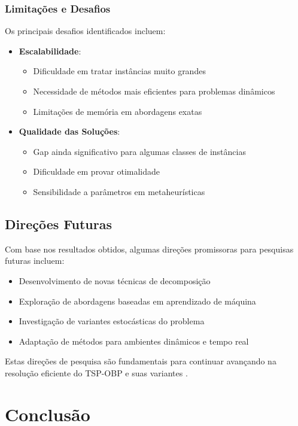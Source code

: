 \documentclass[12pt, a4paper]{report}
\begin{document}
\subsection{Limitações e Desafios}
Os principais desafios identificados incluem:

\begin{itemize}
    \item \textbf{Escalabilidade}:
    \begin{itemize}
        \item Dificuldade em tratar instâncias muito grandes
        \item Necessidade de métodos mais eficientes para problemas dinâmicos
        \item Limitações de memória em abordagens exatas
    \end{itemize}
    
    \item \textbf{Qualidade das Soluções}:
    \begin{itemize}
        \item Gap ainda significativo para algumas classes de instâncias
        \item Dificuldade em provar otimalidade
        \item Sensibilidade a parâmetros em metaheurísticas
    \end{itemize}
\end{itemize}

\section{Direções Futuras}
Com base nos resultados obtidos, algumas direções promissoras para pesquisas futuras incluem:

\begin{itemize}
    \item Desenvolvimento de novas técnicas de decomposição
    \item Exploração de abordagens baseadas em aprendizado de máquina
    \item Investigação de variantes estocásticas do problema
    \item Adaptação de métodos para ambientes dinâmicos e tempo real
\end{itemize}

Estas direções de pesquisa são fundamentais para continuar avançando na resolução eficiente do TSP-OBP e suas variantes \cite{gomes2018, ramos}.

\chapter{Conclusão}
\end{document}
